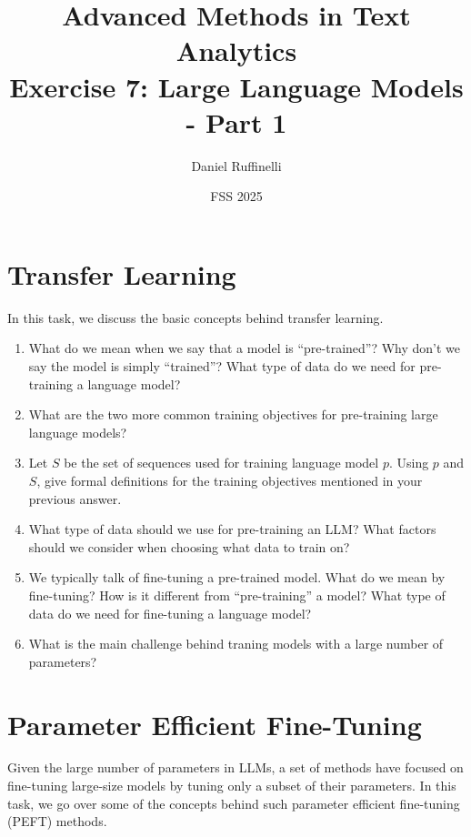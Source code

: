 \documentclass[11pt,a4paper]{article}
\title{Advanced Methods in Text Analytics \\ 
Exercise 7: Large Language Models - Part 1}
\author{Daniel Ruffinelli}
\date{FSS 2025}
\begin{document}
\maketitle

\section{Transfer Learning}

In this task, we discuss the basic concepts behind transfer learning.

\begin{enumerate}[label=(\alph*)]
    \item What do we mean when we say that a model is ``pre-trained''?
          Why don't we say the model is simply ``trained''?
          What type of data do we need for pre-training a language model?
    \item What are the two more common training objectives for pre-training
          large language models?
    \item Let $S$ be the set of sequences used for training language model $p$.
          Using $p$ and $S$, give formal definitions for the training objectives
          mentioned in your previous answer.
    \item What type of data should we use for pre-training an LLM? What factors
          should we consider when choosing what data to train on?
    \item We typically talk of fine-tuning a pre-trained model. What do we mean
          by fine-tuning? How is it different from ``pre-training'' a model?
          What type of data do we need for fine-tuning a language model?
    \item What is the main challenge behind traning models with a large number
          of parameters?
\end{enumerate}

\section{Parameter Efficient Fine-Tuning}

Given the large number of parameters in LLMs, a set of methods have focused on
fine-tuning large-size models by tuning only a subset of their parameters.
In this task, we go over some of the concepts behind such parameter efficient
fine-tuning (PEFT) methods.
\end{document}
